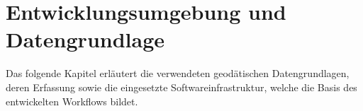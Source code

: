 \section{Entwicklungsumgebung und Datengrundlage}

Das folgende Kapitel erläutert die verwendeten geodätischen Datengrundlagen, deren Erfassung sowie die eingesetzte Softwareinfrastruktur, welche die Basis des entwickelten Workflows bildet.
